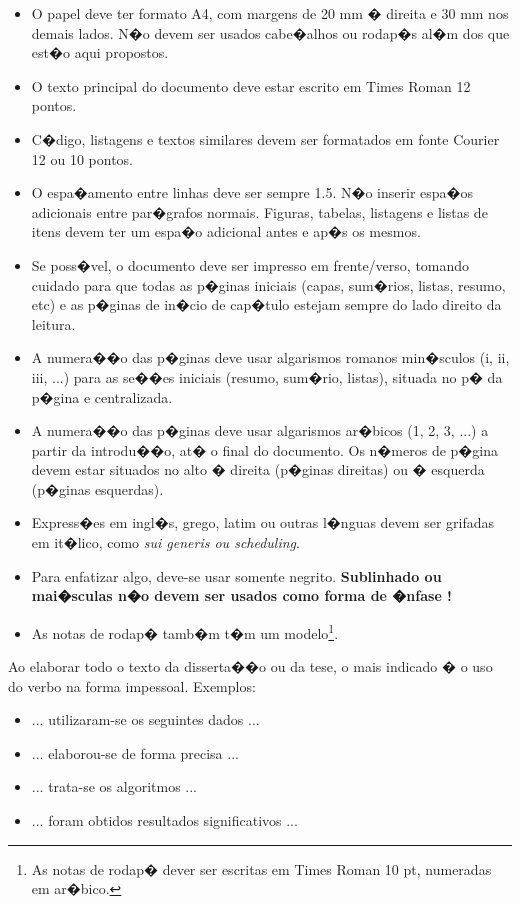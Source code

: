 \documentclass[msc, oneside]{ppgiathesis}
\begin{document}
\begin{itemize}
\item O papel deve ter formato A4, com margens de 20 mm � direita
e 30 mm nos demais lados. N�o devem ser usados cabe�alhos ou
rodap�s al�m dos que est�o aqui propostos. \item O texto principal
do documento deve estar escrito em Times Roman 12 pontos. \item
C�digo, listagens e textos similares devem ser formatados em fonte
Courier 12 ou 10 pontos. \item O espa�amento entre linhas deve ser
sempre 1.5. N�o inserir espa�os adicionais entre par�grafos
normais. Figuras, tabelas, listagens e listas de itens devem ter
um espa�o adicional antes e ap�s os mesmos. \item Se poss�vel, o
documento deve ser impresso em frente/verso, tomando cuidado para
que todas as p�ginas iniciais (capas, sum�rios, listas, resumo,
etc) e as p�ginas de in�cio de cap�tulo estejam sempre do lado
direito da leitura. \item A numera��o das p�ginas deve usar
algarismos romanos min�sculos (i, ii, iii, ...) para as se��es
iniciais (resumo, sum�rio, listas), situada no p� da p�gina e
centralizada. \item A numera��o das p�ginas deve usar algarismos
ar�bicos (1, 2, 3, ...) a partir da introdu��o, at� o final do
documento. Os n�meros de p�gina devem estar situados no alto �
direita (p�ginas direitas) ou � esquerda (p�ginas esquerdas).
\item Express�es em ingl�s, grego, latim ou outras l�nguas devem
ser grifadas em it�lico, como \textit{sui generis ou scheduling}.
\item Para enfatizar algo, deve-se usar somente negrito.
\textbf{Sublinhado ou mai�sculas n�o devem ser usados como forma
de �nfase !} \item As notas de rodap� tamb�m t�m um
modelo\footnote{As notas de rodap� dever ser escritas em Times
Roman 10 pt, numeradas em ar�bico.}.
\end{itemize}

Ao elaborar todo o texto da disserta��o ou da tese, o mais
indicado � o uso do verbo na forma impessoal. Exemplos:

\begin{itemize}
\item ... utilizaram-se os seguintes dados ... \item ...
elaborou-se de forma precisa ... \item ... trata-se os algoritmos
... \item ... foram obtidos resultados significativos ...
\end{itemize}
\end{document}
